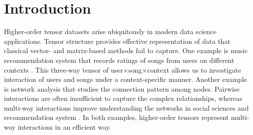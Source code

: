 \documentclass{article}
\theoremstyle{definition}
\begin{document}
\section{Introduction}\label{sec:int}
\vspace{-.1cm}
Higher-order tensor datasets arise ubiquitously in modern data science applications.
Tensor structure provides effective representation of data that classical vector- and matrix-based methods fail to capture. 
One example is music recommendation system that records ratings of songs from users on different contexts \citep{baltrunas2011incarmusic}. This three-way tensor of user$\times$song$\times$context allows us to investigate interaction of users and songs under a context-specific manner.
Another example is network analysis that studies the connection pattern among nodes.  Pairwise interactions are often insufficient to capture the complex relationships, whereas multi-way interactions improve understanding the networks in social sciences \citep{gao2021minimax} and recommendation system \citep{han2020exact}. In both examples, higher-order tensors represent multi-way interactions in an efficient way.


\end{document}
